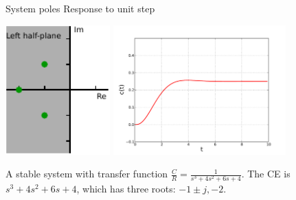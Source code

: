 \documentclass[a4paper,11pt]{report}
\theoremstyle{definition}
\begin{document}
\begin{figure}[H]
  \centering
  \noindent System poles \hspace{2cm} Response to unit step

  \vspace{0.2cm}
  \includegraphics[height=5cm]{fig/stability.pdf}
  \includegraphics[height=5cm]{fig/sys-stable.pdf}
  \caption{A stable system with transfer function
    $\frac{C}{R}=\frac{1}{s^3+4s^2+6s+4}$. The CE is $s^3+4s^2+6s+4$,
    which has three roots: $-1\pm j, -2$.}
  \label{fig:ex-stable}
\end{figure}
\end{document}

